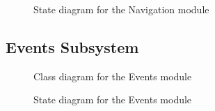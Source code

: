 \documentclass{article}
\begin{document}
			\begin{figure}[H]
				
				\caption{State diagram for the Navigation module}
				
			\end{figure}
	
		\subsection{Events Subsystem}
		
			\begin{figure}[H]
				
				\caption{Class diagram for the Events module}
				
			\end{figure}
		
			\begin{figure}[H]
				
				\caption{State diagram for the Events module}
				
			\end{figure}
			
\end{document}
